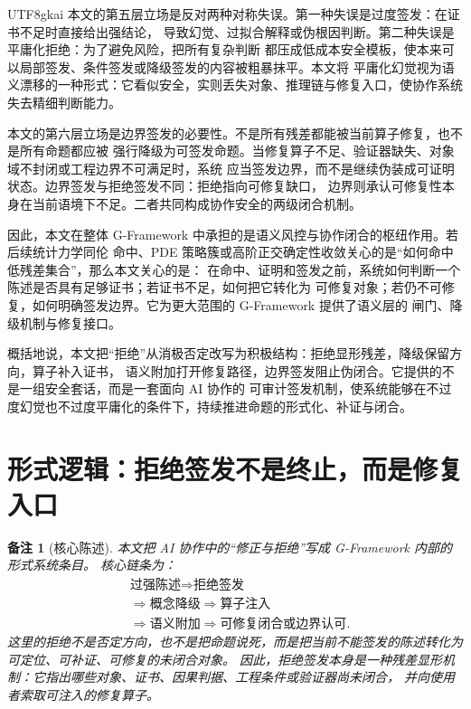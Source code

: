 \documentclass[12pt]{article}
\newtheorem{remark}{备注}[section]
\newcommand{\GFramework}{\textsf{G-Framework}}
\begin{document}
\begin{CJK*}{UTF8}{gkai}
本文的第五层立场是反对两种对称失误。第一种失误是过度签发：在证书不足时直接给出强结论，
导致幻觉、过拟合解释或伪根因判断。第二种失误是平庸化拒绝：为了避免风险，把所有复杂判断
都压成低成本安全模板，使本来可以局部签发、条件签发或降级签发的内容被粗暴抹平。本文将
平庸化幻觉视为语义漂移的一种形式：它看似安全，实则丢失对象、推理链与修复入口，使协作系统
失去精细判断能力。

本文的第六层立场是边界签发的必要性。不是所有残差都能被当前算子修复，也不是所有命题都应被
强行降级为可签发命题。当修复算子不足、验证器缺失、对象域不封闭或工程边界不可满足时，系统
应当签发边界，而不是继续伪装成可证明状态。边界签发与拒绝签发不同：拒绝指向可修复缺口，
边界则承认可修复性本身在当前语境下不足。二者共同构成协作安全的两级闭合机制。

因此，本文在整体 \GFramework{} 中承担的是语义风控与协作闭合的枢纽作用。若后续统计力学同伦
命中、PDE 策略簇或高阶正交确定性收敛关心的是“如何命中低残差集合”，那么本文关心的是：
在命中、证明和签发之前，系统如何判断一个陈述是否具有足够证书；若证书不足，如何把它转化为
可修复对象；若仍不可修复，如何明确签发边界。它为更大范围的 \GFramework{} 提供了语义层的
闸门、降级机制与修复接口。

概括地说，本文把“拒绝”从消极否定改写为积极结构：拒绝显形残差，降级保留方向，算子补入证书，
语义附加打开修复路径，边界签发阻止伪闭合。它提供的不是一组安全套话，而是一套面向 AI 协作的
可审计签发机制，使系统能够在不过度幻觉也不过度平庸化的条件下，持续推进命题的形式化、补证与闭合。

\setcounter{tocdepth}{3}
\setcounter{secnumdepth}{3}
\tableofcontents
\clearpage

\section{形式逻辑：拒绝签发不是终止，而是修复入口}
\label{sec:tex52-main}

\begin{remark}[核心陈述]
本文把 AI 协作中的“修正与拒绝”写成 \GFramework{} 内部的形式系统条目。
核心链条为：
\[
\begin{aligned}
  &\text{过强陈述}
  \Longrightarrow
  \text{拒绝签发}\\
  &\Longrightarrow
  \text{概念降级}
  \Longrightarrow
  \text{算子注入}\\
  &\Longrightarrow
  \text{语义附加}
  \Longrightarrow
  \text{可修复闭合或边界认可}.
\end{aligned}
\]
这里的拒绝不是否定方向，也不是把命题说死，而是把当前不能签发的陈述转化为可定位、可补证、可修复的未闭合对象。
因此，拒绝签发本身是一种残差显形机制：它指出哪些对象、证书、因果判据、工程条件或验证器尚未闭合，
并向使用者索取可注入的修复算子。
\end{remark}


\end{CJK*}
\end{document}
